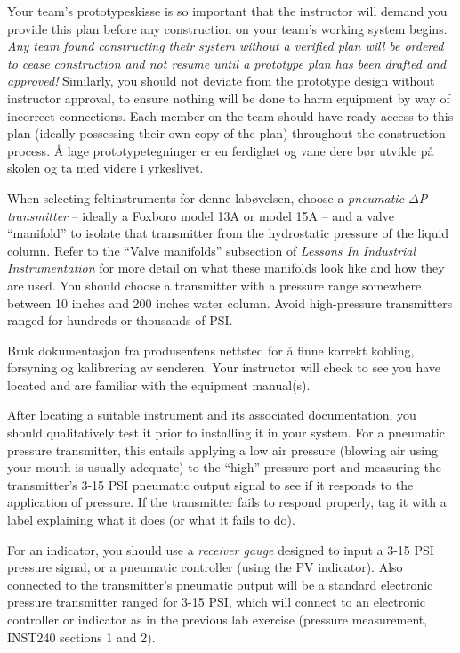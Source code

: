 Your team's prototypeskisse is so important that the instructor will demand you provide this plan before any construction on your team's working system begins.  {\it Any team found constructing their system without a verified plan will be ordered to cease construction and not resume until a prototype plan has been drafted and approved!}  Similarly, you should not deviate from the prototype design without instructor approval, to ensure nothing will be done to harm equipment by way of incorrect connections.  Each member on the team should have ready access to this plan (ideally possessing their own copy of the plan) throughout the construction process.  Å lage prototypetegninger er en ferdighet og vane dere bør utvikle på skolen og ta med videre i yrkeslivet.

\vskip 10pt

When selecting feltinstruments for denne labøvelsen, choose a {\it pneumatic $\Delta$P transmitter} -- ideally a Foxboro model 13A or model 15A -- and a valve ``manifold'' to isolate that transmitter from the hydrostatic pressure of the liquid column.  Refer to the ``Valve manifolds'' subsection of {\it Lessons In Industrial Instrumentation} for more detail on what these manifolds look like and how they are used.  You should choose a transmitter with a pressure range somewhere between 10 inches and 200 inches water column.  Avoid high-pressure transmitters ranged for hundreds or thousands of PSI.

Bruk dokumentasjon fra produsentens nettsted for å finne korrekt kobling, forsyning og kalibrering av senderen.  Your instructor will check to see you have located and are familiar with the equipment manual(s).

After locating a suitable instrument and its associated documentation, you should qualitatively test it prior to installing it in your system.  For a pneumatic pressure transmitter, this entails applying a low air pressure (blowing air using your mouth is usually adequate) to the ``high'' pressure port and measuring the transmitter's 3-15 PSI pneumatic output signal to see if it responds to the application of pressure.  If the transmitter fails to respond properly, tag it with a label explaining what it does (or what it fails to do).

For an indicator, you should use a {\it receiver gauge} designed to input a 3-15 PSI pressure signal, or a pneumatic controller (using the PV indicator).  Also connected to the transmitter's pneumatic output will be a standard electronic pressure transmitter ranged for 3-15 PSI, which will connect to an electronic controller or indicator as in the previous lab exercise (pressure measurement, INST240 sections 1 and 2).

